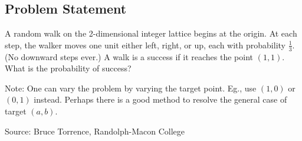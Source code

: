 \subsection*{Problem Statement}

A random walk on the 2-dimensional integer lattice begins at the origin. At each step, the walker moves one unit either left, right, or up, each with probability $\frac13$. (No downward steps ever.) A walk is a success if it reaches the point $(1,1)$. What is the probability of success?

Note: One can vary the problem by varying the target point. Eg., use $(1, 0)$ or $(0,1)$ instead. Perhaps there is a good method to resolve the general case of target $(a, b)$.

Source: Bruce Torrence, Randolph-Macon College
